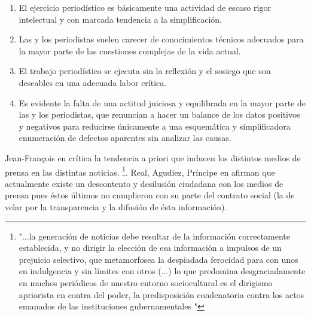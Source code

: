 \begin{enumerate}
\item El ejercicio periodístico es básicamente una actividad de escaso rigor intelectual y con marcada tendencia a la simplificación. 
\item Las y los periodistas suelen carecer de conocimientos técnicos adecuados para la mayor parte de las cuestiones complejas de la vida actual.
\item El trabajo periodístico se ejecuta sin la reflexión y el sosiego que son deseables en una adecuada labor crítica. 
\item Es evidente la falta de una actitud juiciosa y equilibrada en la mayor parte de las y los periodistas, que renuncian a hacer un balance de los datos positivos y negativos para reducirse únicamente a una esquemática y simplificadora enumeración de defectos aparentes sin analizar las causas.
\end{enumerate}

Jean-François en \cite{revel1990conocimiento} crítica la tendencia a priori que inducen los distintos medios de prensa en las distintas noticias. \footnote{"...la generación de noticias debe resultar de la información correctamente establecida, y no dirigir la elección de esa información a impulsos de un prejuicio selectivo, que metamorfosea la despiadada ferocidad para con unos en indulgencia y sin límites con otros (...) lo que predomina desgraciadamente en muchos periódicos de nuestro entorno sociocultural es el dirigismo apriorista en contra del poder, la predisposición condenatoria contra los actos emanados de las instituciones gubernamentales "}. Real, Agudiez, Príncipe en \cite{ESMPESMP0707110189A} afirman que actualmente existe un descontento y desilusión ciudadana con los medios de prensa pues éstos últimos no cumplieron con su parte del contrato social (la de velar por la transparencia y la difusión de ésta información). 


